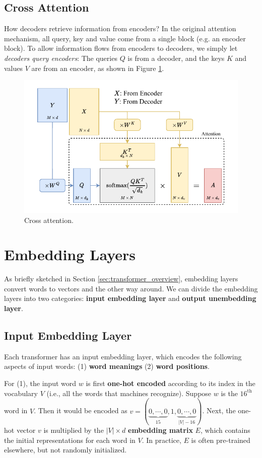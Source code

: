 \subsection{Cross Attention}

How decoders retrieve information from encoders? In the original attention mechanism, all query, key and value come from a single block (e.g. an encoder block). To allow information flows from encoders to decoders, we simply let \textit{decoders query encoders}: The queries $Q$ is from a decoder, and the keys $K$ and values $V$ are from an encoder, as shown in Figure \ref{fig:cross_attention}.

\begin{figure}
    \centering
    \includegraphics[width=0.8\linewidth]{fig/cross_attention.pdf}
    \caption{Cross attention.}
    \label{fig:cross_attention}
\end{figure}

\section{Embedding Layers}

As briefly sketched in Section \ref{sec:transformer_overview}, embedding layers convert words to vectors and the other way around. We can divide the embedding layers into two categories: \textbf{input embedding layer} and \textbf{output unembedding layer}.

\subsection{Input Embedding Layer}

Each transformer has an input embedding layer, which encodes the following aspects of input words: (1) \textbf{word meanings} (2) \textbf{word positions}. 

For (1), the input word $w$ is first \textbf{one-hot encoded} according to its index in the vocabulary $V$ (i.e., all the words that machines recognize). Suppose $w$ is the $16^{\text{th}}$ word in $V$. Then it would be encoded as $v = (\underbrace{0, \cdots, 0}_{15}, 1, \underbrace{0, \cdots, 0}_{|V|-16})$. Next, the one-hot vector $v$ is multiplied by the $|V|\times d$ \textbf{embedding matrix} $E$, which contains the initial representations for each word in $V$. In practice, $E$ is often pre-trained elsewhere, but not randomly initialized.

